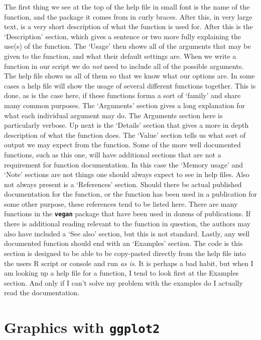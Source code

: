 \documentclass[]{book}
\theoremstyle{definition}
\theoremstyle{definition}
\theoremstyle{definition}
\theoremstyle{remark}
\begin{document}
The first thing we see at the top of the help file in small font is the
name of the function, and the package it comes from in curly braces.
After this, in very large text, is a very short description of what the
function is used for. After this is the `Description' section, which
gives a sentence or two more fully explaining the use(s) of the
function. The `Usage' then shows all of the arguments that may be given
to the function, and what their default settings are. When we write a
function in our script we do \emph{not} need to include all of the
possible arguments. The help file shows us all of them so that we know
what our options are. In some cases a help file will show the usage of
several different functions together. This is done, as is the case here,
if these functions forma a sort of `family' and share many common
purposes. The `Arguments' section gives a long explanation for what each
individual argument may do. The Arguments section here is particularly
verbose. Up next is the `Details' section that gives a more in depth
description of what the function does. The `Value' section tells us what
sort of output we may expect from the function. Some of the more well
documented functions, such as this one, will have additional sections
that are not a requirement for function documentation. In this case the
`Memory usage' and `Note' sections are not things one should always
expect to see in help files. Also not always present is a `References'
section. Should there be actual published documentation for the
function, or the function has been used in a publication for some other
purpose, these references tend to be listed here. There are many
functions in the \textbf{\texttt{vegan}} package that have been used in
dozens of publications. If there is additional reading relevant to the
function in question, the authors may also have included a `See also'
section, but this is not standard. Lastly, any well documented function
should end with an `Examples' section. The code is this section is
designed to be able to be copy-pasted directly from the help file into
the users R script or console and run \emph{as is}. It is perhaps a bad
habit, but when I am looking up a help file for a function, I tend to
look first at the Examples section. And only if I can't solve my problem
with the examples do I actually read the documentation.

\chapter{\texorpdfstring{Graphics with
\textbf{\texttt{ggplot2}}}{Graphics with ggplot2}}\label{graphics}
\end{document}
